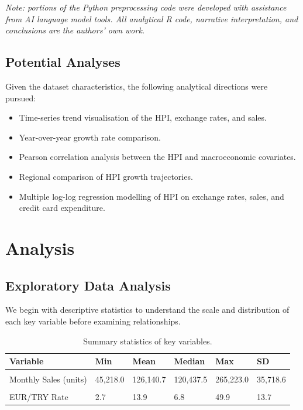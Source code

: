 \documentclass[
  11pt,
  a4paper,
]{article}
\providecommand{\tightlist}{%
  \setlength{\itemsep}{0pt}\setlength{\parskip}{0pt}}
\begin{document}
\emph{Note: portions of the Python preprocessing code were developed
with assistance from AI language model tools. All analytical R code,
narrative interpretation, and conclusions are the authors' own work.}

\subsection{Potential Analyses}\label{potential-analyses}

Given the dataset characteristics, the following analytical directions
were pursued:

\begin{itemize}
\tightlist
\item
  Time-series trend visualisation of the HPI, exchange rates, and sales.
\item
  Year-over-year growth rate comparison.
\item
  Pearson correlation analysis between the HPI and macroeconomic
  covariates.
\item
  Regional comparison of HPI growth trajectories.
\item
  Multiple log-log regression modelling of HPI on exchange rates, sales,
  and credit card expenditure.
\end{itemize}

\section{Analysis}\label{sec-analysis}

\subsection{Exploratory Data Analysis}\label{exploratory-data-analysis}

We begin with descriptive statistics to understand the scale and
distribution of each key variable before examining relationships.

\begingroup\fontsize{9}{11}\selectfont

\begin{longtable}[t]{llllll}

\caption{\label{tbl-summary-stats}Summary statistics of key variables.}

\tabularnewline

\toprule
Variable & Min & Mean & Median & Max & SD\\
\midrule
\cellcolor{gray!10}{House Price Index} & \cellcolor{gray!10}{7.7} & \cellcolor{gray!10}{51.1} & \cellcolor{gray!10}{14.6} & \cellcolor{gray!10}{204.4} & \cellcolor{gray!10}{60.8}\\
Monthly Sales (units) & 45,218.0 & 126,140.7 & 120,437.5 & 265,223.0 & 35,718.6\\
\cellcolor{gray!10}{USD/TRY Rate} & \cellcolor{gray!10}{2.1} & \cellcolor{gray!10}{12.6} & \cellcolor{gray!10}{6.1} & \cellcolor{gray!10}{42.7} & \cellcolor{gray!10}{12.4}\\
EUR/TRY Rate & 2.7 & 13.9 & 6.8 & 49.9 & 13.7\\
\bottomrule

\end{longtable}
\end{document}
